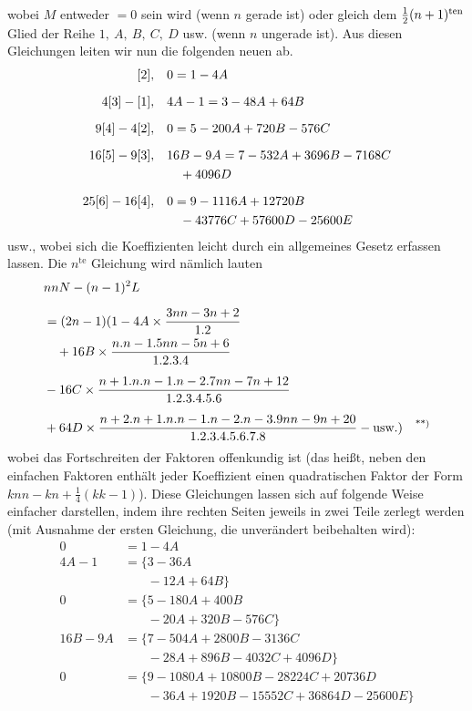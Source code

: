 wobei \(M\) entweder \(=0\) sein wird (wenn \(n\) gerade ist) oder gleich dem \(\frac12(n+\nobreak{}1)^{\mathrm{ten}}\) Glied der Reihe
\(1,\ A,\ B,\ C,\ D\) usw. (wenn \(n\) ungerade ist). Aus diesen Gleichungen leiten wir nun die folgenden neuen ab.
\[
\begin{aligned}
\relax [2],\quad&0=1-4A\\[6pt]
4[3]-[1],\quad&4A-1=3-48A+64B\\[6pt]
9[4]-4[2],\quad&0=5-200A+720B-576C\\[6pt]
16[5]-9[3],\quad&16B-9A=7-532A+3696B-7168C\\&\quad+4096D\\[6pt]
25[6]-16[4],\quad&0=9-1116A+12720B\\&\quad-43776C+57600D-25600E
\end{aligned}
\]
usw., wobei sich die Koeffizienten leicht durch ein allgemeines Gesetz erfassen lassen. Die \(n^{\mathrm{te}}\) Gleichung wird nämlich lauten
\[
\begin{aligned}
&nnN-(n-1)^2L\\[6pt]&=(2n-1)(1-4A\times\frac{3nn-3n+2}{1.2}
\\&\quad+16B\times\frac{n.n-1.5nn-5n+6}{1.2.3.4}\\[6pt]
&-16C\times\frac{n+1.n.n-1.n-2.7nn-7n+12}{1.2.3.4.5.6}\\[6pt]
&+64D\times\frac{n+2.n+1.n.n-1.n-2.n-3.9nn-9n+20}{1.2.3.4.5.6.7.8}-\text{usw.})\quad\text{\textsuperscript{**)}}
\end{aligned}
\]\begingroup\renewcommand{\thefootnote}{**)}\endgroup
wobei das Fortschreiten der Faktoren offenkundig ist (das heißt, neben den einfachen Faktoren enthält jeder Koeffizient einen quadratischen Faktor der Form \(knn-kn+\frac14(kk-1)\)). Diese Gleichungen
lassen sich auf folgende Weise einfacher darstellen, indem ihre rechten Seiten jeweils in zwei
Teile zerlegt werden (mit Ausnahme der ersten Gleichung, die unverändert beibehalten wird):
\[
\begin{aligned}
0&=1-4A\\[6pt]
4A-1&=\{3-36A\\[6pt]
&\phantom{=\{}-12A+64B\}\\[6pt]
0&=\{5-180A+400B\\[6pt]
&\phantom{=\{}-20A+320B-576C\}\\[6pt]
16B-9A&=\{7-504A+2800B-3136C\\[6pt]
&\phantom{=\{}-28A+896B-4032C+4096D\}\\[6pt]
0&=\{9-1080A+10800B-28224C+20736D\\[6pt]
&\phantom{=\{}-36A+1920B-15552C+36864D-25600E\}
\end{aligned}
\]
